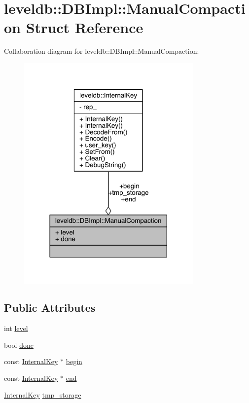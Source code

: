 \hypertarget{structleveldb_1_1_d_b_impl_1_1_manual_compaction}{}\section{leveldb\+:\+:D\+B\+Impl\+:\+:Manual\+Compaction Struct Reference}
\label{structleveldb_1_1_d_b_impl_1_1_manual_compaction}


Collaboration diagram for leveldb\+:\+:D\+B\+Impl\+:\+:Manual\+Compaction\+:\nopagebreak
\begin{figure}[H]
\begin{center}
\leavevmode
\includegraphics[width=258pt]{structleveldb_1_1_d_b_impl_1_1_manual_compaction__coll__graph}
\end{center}
\end{figure}
\subsection*{Public Attributes}
\begin{DoxyCompactItemize}
\item 
int \hyperlink{structleveldb_1_1_d_b_impl_1_1_manual_compaction_a0dd5f180af0b1019f04532bfdb317141}{level}
\item 
bool \hyperlink{structleveldb_1_1_d_b_impl_1_1_manual_compaction_ae71836e3b7d69f5cc644199639d0cf1f}{done}
\item 
const \hyperlink{classleveldb_1_1_internal_key}{Internal\+Key} $\ast$ \hyperlink{structleveldb_1_1_d_b_impl_1_1_manual_compaction_ad3c64b2e5be6cdf8b34bc49ab1ec9ab3}{begin}
\item 
const \hyperlink{classleveldb_1_1_internal_key}{Internal\+Key} $\ast$ \hyperlink{structleveldb_1_1_d_b_impl_1_1_manual_compaction_a18771027d956c53188266bd860ab384b}{end}
\item 
\hyperlink{classleveldb_1_1_internal_key}{Internal\+Key} \hyperlink{structleveldb_1_1_d_b_impl_1_1_manual_compaction_acfd5de0d18f7df7d222f1c09e500c9bc}{tmp\+\_\+storage}
\end{DoxyCompactItemize}


